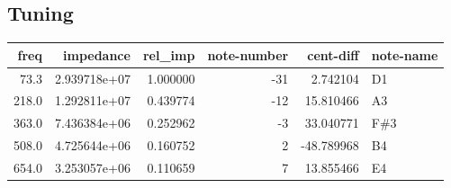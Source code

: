 \documentclass{article}
\begin{document}
\subsection{Tuning}
\begin{centering}
\begin{tabular}{rrrrrl}
\toprule
 freq &    impedance &  rel\_imp &  note-number &  cent-diff & note-name \\
\midrule
 73.3 & 2.939718e+07 & 1.000000 &          -31 &   2.742104 &        D1 \\
218.0 & 1.292811e+07 & 0.439774 &          -12 &  15.810466 &        A3 \\
363.0 & 7.436384e+06 & 0.252962 &           -3 &  33.040771 &       F\#3 \\
508.0 & 4.725644e+06 & 0.160752 &            2 & -48.789968 &        B4 \\
654.0 & 3.253057e+06 & 0.110659 &            7 &  13.855466 &        E4 \\
\bottomrule
\end{tabular}
\end{centering}
\end{document}
